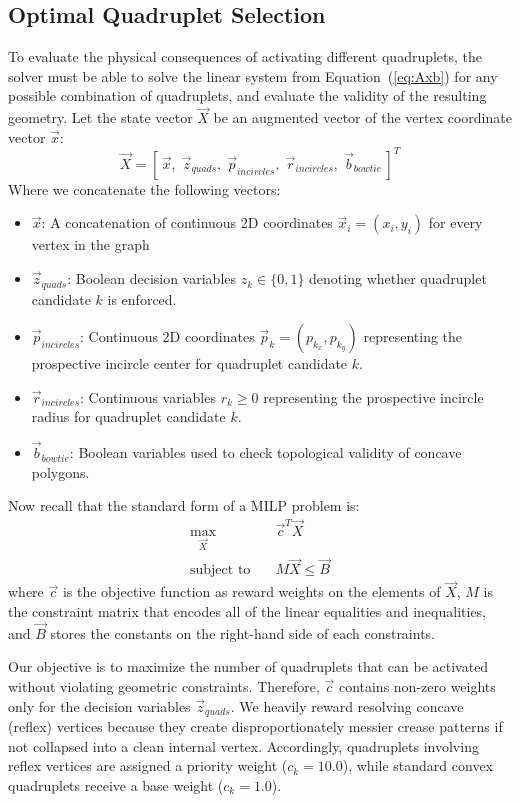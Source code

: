 \documentclass[11pt]{article}
\begin{document}
\subsection{Optimal Quadruplet Selection}
To evaluate the physical consequences of activating different quadruplets, the solver must be able to solve the linear system from Equation~(\ref{eq:Axb}) for any possible combination of quadruplets, and evaluate the validity of the resulting geometry. Let the state vector $\vec{X}$ be an augmented vector of the vertex coordinate vector $\vec{x}$:
\begin{equation}
    \vec{X} = \left[ \, \vec{x}, \; \vec{z}_{quads}, \; \vec{p}_{incircles}, \; \vec{r}_{incircles}, \; \vec{b}_{bowtie} \, \right]^T
\end{equation}
Where we concatenate the following vectors:
\begin{itemize}
    \item $\vec{x}$: A concatenation of continuous 2D coordinates $\vec{x}_i = (x_i, y_i)$ for every vertex in the graph
    \item $\vec{z}_{quads}$: Boolean decision variables $z_k \in \{0, 1\}$ denoting whether quadruplet candidate $k$ is enforced.
    \item $\vec{p}_{incircles}$: Continuous 2D coordinates $\vec{p}_k = (p_{k_x}, p_{k_y})$ representing the prospective incircle center for quadruplet candidate $k$.
    \item $\vec{r}_{incircles}$: Continuous variables $r_k \ge 0$ representing the prospective incircle radius for quadruplet candidate $k$.
    \item $\vec{b}_{bowtie}$: Boolean variables used to check topological validity of concave polygons.
\end{itemize}

Now recall that the standard form of a MILP problem is:
\begin{align}
    \max_{\vec{X}} \quad & \vec{c}^T \vec{X} \\
    \text{subject to} \quad & M \vec{X} \le \vec{B}
\end{align}
where $\vec{c}$ is the objective function as reward weights on the elements of $\vec{X}$, $M$ is the constraint matrix that encodes all of the linear equalities and inequalities, and $\vec{B}$ stores the constants on the right-hand side of each constraints.


Our objective is to maximize the number of quadruplets that can be activated without violating geometric constraints. Therefore, $\vec{c}$ contains non-zero weights only for the decision variables $\vec{z}_{quads}$. We heavily reward resolving concave (reflex) vertices because they create disproportionately messier crease patterns if not collapsed into a clean internal vertex. Accordingly, quadruplets involving reflex vertices are assigned a priority weight ($c_k = 10.0$), while standard convex quadruplets receive a base weight ($c_k = 1.0$).
\end{document}
